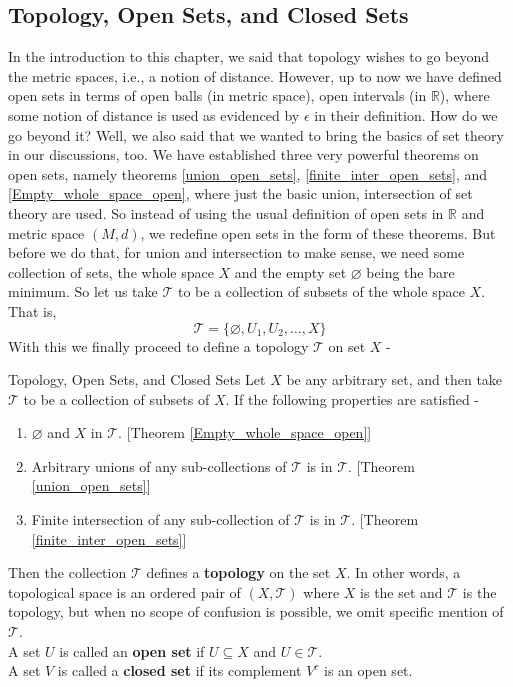 \subsection{Topology, Open Sets, and Closed Sets}
In the introduction to this chapter, we said that topology wishes to go beyond the metric spaces, i.e., a notion of distance. However, up to now we have defined open sets in terms of open balls (in metric space), open intervals (in $\mathbb{R}$), where some notion of distance is used as evidenced by $\epsilon$ in their definition. How do we go beyond it? Well, we also said that we wanted to bring the basics of set theory in our discussions, too. We have established three very powerful theorems on open sets, namely theorems \eqref{union_open_sets}, \eqref{finite_inter_open_sets}, and \eqref{Empty_whole_space_open}, where just the basic union, intersection of set theory are used. So instead of using the usual definition of open sets in $\mathbb{R}$ and metric space $(M,d)$, we redefine open sets in the form of these theorems. But before we do that, for union and intersection to make sense, we need some collection of sets, the whole space $X$ and the empty set $\varnothing$ being the bare minimum. So let us take $\mathcal{T}$ to be a collection of subsets of the whole space $X$. That is, $$\mathcal{T}=\{\varnothing,U_1,U_2,\dots,X\}$$
With this we finally proceed to define a topology $\mathcal{T}$ on set $X$ -
\begin{Definition}{Topology, Open Sets, and Closed Sets}\label{topology_open_sets_closed set}
    Let $X$ be any arbitrary set, and then take $\mathcal{T}$ to be a collection of subsets of $X$. If the following properties are satisfied -
    \begin{enumerate}
        \item $\varnothing$ and $X$ in $\mathcal{T}$. [Theorem \eqref{Empty_whole_space_open}]
        \item Arbitrary unions of any sub-collections of $\mathcal{T}$ is in $\mathcal{T}$. [Theorem \eqref{union_open_sets}]
        \item Finite intersection of any sub-collection of $\mathcal{T}$ is in $\mathcal{T}$. [Theorem \eqref{finite_inter_open_sets}]
    \end{enumerate}
    Then the collection $\mathcal{T}$ defines a \textbf{topology} on the set $X$. In other words, a topological space is an ordered pair of $(X,\mathcal{T})$ where $X$ is the set and $\mathcal{T}$ is the topology, but when no scope of confusion is possible, we omit specific mention of $\mathcal{T}$.\\
    A set $U$ is called an \textbf{open set} if $U\subseteq X$ and $U\in\mathcal{T}$.\\
    A set $V$ is called a \textbf{closed set} if its complement $V^c$ is an open set.
\end{Definition}
